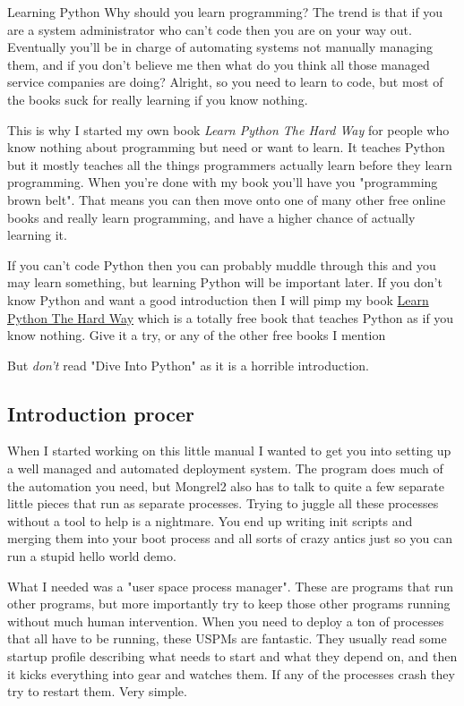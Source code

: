 \begin{aside}{Learning Python}
Why should you learn programming?  The trend is that if you are a system administrator
who can't code then you are on your way out.  Eventually you'll be in charge of automating
systems not manually managing them, and if you don't believe me then what do you think all
those managed service companies are doing?  Alright, so you need to learn to code, but
most of the books suck for really learning if you know nothing.

This is why I started my own book \emph{Learn Python The Hard Way} for people
who know nothing about programming but need or want to learn.  It teaches
Python but it mostly teaches all the things programmers actually learn before
they learn programming.  When you're done with my book you'll have you
"programming brown belt".  That means you can then move onto one of many other
free online books and really learn programming, and have a higher chance of
actually learning it.

If you can't code Python then you can probably muddle through this and you may
learn something, but learning Python will be important later.  If you don't
know Python and want a good introduction then I will pimp my book
\href{http://learnpythonthehardway.org}{Learn Python The Hard Way} which is a
totally free book that teaches Python as if you know nothing.  Give it a try,
or any of the other free books I mention

But \emph{don't} read "Dive Into Python" as it is a horrible introduction.
\end{aside}

\subsection{Introduction procer}

When I started working on this little manual I wanted to get you into setting up
a well managed and automated deployment system.  The  program does 
much of the automation you need, but Mongrel2 also has to talk to quite a few 
separate little pieces that run as separate processes.  Trying to juggle all these
processes without a tool to help is a nightmare.  You end up writing init scripts
and merging them into your boot process and all sorts of crazy antics just so you
can run a stupid hello world demo.

What I needed was a "user space process manager".  These are programs that run other
programs, but more importantly try to keep those other programs running without much
human intervention.  When you need to deploy a ton of processes that all have to
be running, these USPMs are fantastic.  They usually read some startup profile describing
what needs to start and what they depend on, and then it kicks everything into gear
and watches them.  If any of the processes crash they try to restart them.  Very simple.

